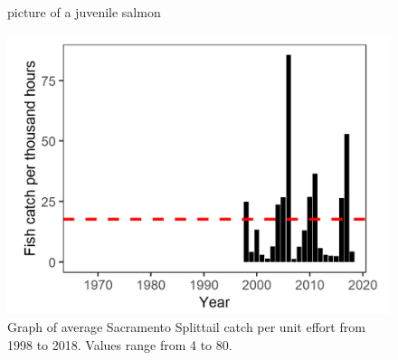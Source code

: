 \documentclass[
]{book}
\begin{document}
\begin{panel-grid}
\begin{columns-nocenter}
\begin{column800}
\begin{figure}
{}

\caption{picture of a juvenile salmon}\label{fig:unnamed-chunk-34}
\end{figure}

\end{column800}

\end{columns-nocenter}

\begin{columns-nocenter}

\begin{column800}

\begin{expand}

\begin{figure}
\includegraphics[width=15.25in]{figures/yolo_splittail} \caption{Graph of average Sacramento Splittail catch per unit effort from 1998 to 2018. Values range from 4 to 80.}\label{fig:unnamed-chunk-35}
\end{figure}

\end{expand}

\end{column800}

\begin{column40}

~

\end{column40}

\begin{column800}

\begin{expand}


\end{expand}
\end{column800}
\end{columns-nocenter}
\end{panel-grid}
\end{document}
